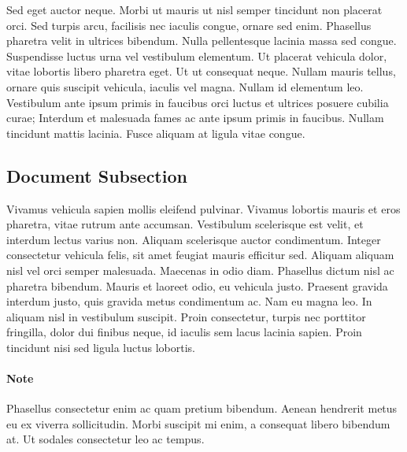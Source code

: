 \documentclass[12pt,a4paper]{book}
\begin{document}
Sed eget auctor neque. Morbi ut mauris ut nisl semper tincidunt non placerat orci.
Sed turpis arcu, facilisis nec iaculis congue, ornare sed enim.
Phasellus pharetra velit in ultrices bibendum. Nulla pellentesque lacinia massa sed congue.
Suspendisse luctus urna vel vestibulum elementum. Ut placerat vehicula dolor, vitae
lobortis libero pharetra eget. Ut ut consequat neque. Nullam mauris tellus, ornare quis
suscipit vehicula, iaculis vel magna. Nullam id elementum leo. Vestibulum ante ipsum primis
in faucibus orci luctus et ultrices posuere cubilia curae; Interdum et malesuada fames ac
ante ipsum primis in faucibus. Nullam tincidunt mattis lacinia. Fusce aliquam at ligula
vitae congue.

\subsection{Document Subsection}

Vivamus vehicula sapien mollis eleifend pulvinar. Vivamus lobortis mauris et eros pharetra,
vitae rutrum ante accumsan. Vestibulum scelerisque est velit, et interdum lectus varius
non. Aliquam scelerisque auctor condimentum. Integer consectetur vehicula felis, sit amet
feugiat mauris efficitur sed. Aliquam aliquam nisl vel orci semper malesuada.
Maecenas in odio diam. Phasellus dictum nisl ac pharetra bibendum. Mauris et laoreet odio,
eu vehicula justo. Praesent gravida interdum justo, quis gravida metus condimentum ac.
Nam eu magna leo. In aliquam nisl in vestibulum suscipit. Proin consectetur, turpis nec
porttitor fringilla, dolor dui finibus neque, id iaculis sem lacus lacinia sapien. Proin
tincidunt nisi sed ligula luctus lobortis.

\paragraph{Note}
Phasellus consectetur enim ac quam pretium bibendum. Aenean hendrerit metus eu ex viverra
sollicitudin. Morbi suscipit mi enim, a consequat libero bibendum at. Ut sodales
consectetur leo ac tempus.
\end{document}
